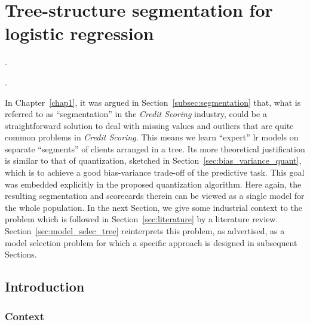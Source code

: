 \chapter{Tree-structure segmentation for logistic regression} \label{chap6}


\epigraph{.}{.}

\minitoc

\bigskip

In Chapter~\ref{chap1}, it was argued in Section~\ref{subsec:segmentation} that, what is referred to as ``segmentation'' in the \textit{Credit Scoring} industry, could be a straightforward solution to deal with missing values and outliers that are quite common problems in \textit{Credit Scoring}. This means we learn ``expert'' \gls{lr} models on separate ``segments'' of clients arranged in a tree. Its more theoretical justification is similar to that of quantization, sketched in Section~\ref{sec:bias_variance_quant}, which is to achieve a good bias-variance trade-off of the predictive task. This goal was embedded explicitly in the proposed quantization algorithm. Here again, the resulting segmentation and scorecards therein can be viewed as a single model for the whole population. In the next Section, we give some industrial context to the problem which is followed in Section~\ref{sec:literature} by a literature review. Section~\ref{sec:model_selec_tree} reinterprets this problem, as advertised, as a model selection problem for which a specific approach is designed in subsequent Sections.


\section{Introduction}

\subsection{Context} \label{subsec:context}

